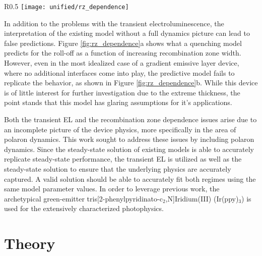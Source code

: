 \documentclass[../thesis.tex]{subfiles}
\begin{document}
\begin{wrapfigure}{R}{0.5\textwidth}
\centering
\texttt{[image: unified/rz\_dependence]}
\caption{(a) Efficiency roll-off predicted by Erickson \textit{et al.} 2014 as a function of recombination zone width.\supercite{Erickson2014} (b) Observed efficiency roll-off for gradient EML devices.}
\label{fig:rz_dependence}
\end{wrapfigure}

In addition to the problems with the transient electroluminescence, the interpretation of the existing model without a full dynamics picture can lead to false predictions.  
Figure \ref{fig:rz_dependence}a shows what a quenching model predicts for the roll-off as a function of increasing recombination zone width.\supercite{Erickson2014}
However, even in the most idealized case of a gradient emissive layer device, where no additional interfaces come into play, the predictive model fails to replicate the behavior, as shown in Figure \ref{fig:rz_dependence}b.
While this device is of little interest for further investigation due to the extreme thickness, the point stands that this model has glaring assumptions for it's applications.

Both the transient EL and the recombination zone dependence issues arise due to an incomplete picture of the device physics, more specifically in the area of polaron dynamics.  
This work sought to address these issues by including polaron dynamics.  
Since the steady-state solution of existing models is able to accurately replicate steady-state performance, the transient EL is utilized as well as the steady-state solution to ensure that the underlying physics are accurately captured.
A valid solution should be able to accurately fit both regimes using the same model parameter values.
In order to leverage previous work, the archetypical green-emitter tris[2-phenylpyridinato-c$_2$,N]Iridium(III) (Ir(ppy)$_3$) is used for the extensively characterized photophysics.\supercite{Baldo2000,Baldo2000a,Tsuboi2006,Adachi2001a,Kawamura2006,Kawamura2005c}

\section{Theory}
\end{document}
